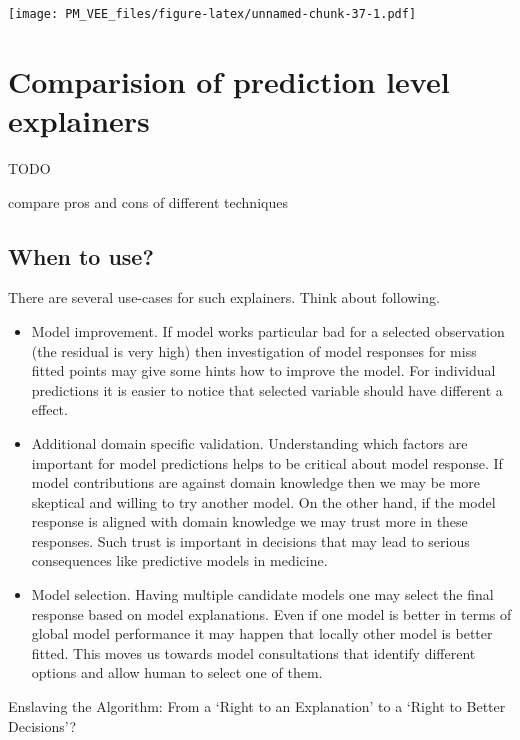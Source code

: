 \documentclass[]{krantz}
\providecommand{\tightlist}{%
  \setlength{\itemsep}{0pt}\setlength{\parskip}{0pt}}
\theoremstyle{definition}
\theoremstyle{definition}
\theoremstyle{definition}
\theoremstyle{remark}
\begin{document}
\texttt{[image: PM\_VEE\_files/figure-latex/unnamed-chunk-37-1.pdf]}

\hypertarget{comparision-of-prediction-level-explainers}{%
\section{Comparision of prediction level
explainers}\label{comparision-of-prediction-level-explainers}}

TODO

compare pros and cons of different techniques

\hypertarget{when-to-use}{%
\subsection{When to use?}\label{when-to-use}}

There are several use-cases for such explainers. Think about following.

\begin{itemize}
\tightlist
\item
  Model improvement. If model works particular bad for a selected
  observation (the residual is very high) then investigation of model
  responses for miss fitted points may give some hints how to improve
  the model. For individual predictions it is easier to notice that
  selected variable should have different a effect.
\item
  Additional domain specific validation. Understanding which factors are
  important for model predictions helps to be critical about model
  response. If model contributions are against domain knowledge then we
  may be more skeptical and willing to try another model. On the other
  hand, if the model response is aligned with domain knowledge we may
  trust more in these responses. Such trust is important in decisions
  that may lead to serious consequences like predictive models in
  medicine.
\item
  Model selection. Having multiple candidate models one may select the
  final response based on model explanations. Even if one model is
  better in terms of global model performance it may happen that locally
  other model is better fitted. This moves us towards model
  consultations that identify different options and allow human to
  select one of them.
\end{itemize}

Enslaving the Algorithm: From a `Right to an Explanation' to a `Right to
Better Decisions'? \citep{Edwards_Veale_2018}
\end{document}
